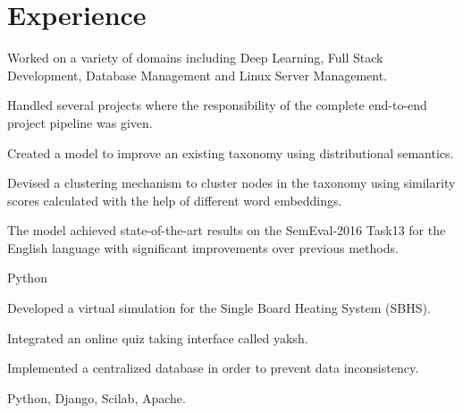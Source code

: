 
\section{Experience}

\begin{tightemize}
\item Worked on a variety of domains including Deep Learning, Full Stack Development, Database Management and Linux Server Management.
\item Handled several projects where the responsibility of the complete end-to-end project pipeline was given.
\end{tightemize}
\sectionsep

\begin{tightemize}
\item Created a model to improve an existing taxonomy using distributional semantics.
\item Devised a clustering mechanism to cluster nodes in the taxonomy using similarity scores calculated with the help of different word embeddings.
\item The model achieved state-of-the-art results on the SemEval-2016 Task13 for the English language with significant improvements over previous methods.
\item {} Python
\end{tightemize}
\sectionsep

\begin{tightemize}
\item Developed a virtual simulation for the Single Board Heating System (SBHS).
\item Integrated an online quiz taking interface called yaksh.
\item Implemented a centralized database in order to prevent data inconsistency.
\item {} Python, Django, Scilab, Apache.
\end{tightemize}
\sectionsep